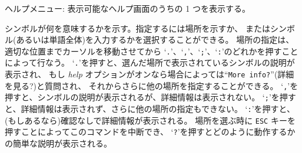 \blist{}
\item[\tb{?}]
ヘルプメニュー: 表示可能なヘルプ画面のうちの 1 つを表示する。
\item[\tb{/}]
シンボルが何を意味するかを示す。指定するには場所を示すか、
またはシンボル(あるいは単語全体)を入力するかを選択することができる。
場所の指定は、適切な位置までカーソルを移動させてから
`{\tt .}'、`{\tt ,}'、`{\tt ;}'、`{\tt :}'のどれかを押すことによって行なう。
`{\tt .}'を押すと、選んだ場所で表示されているシンボルの説明が表示され、
もし {\it help\/}
オプションがオンなら場合によっては``{\tt More info?}''(詳細を見る?)と質問され、
それからさらに他の場所を指定することができる。
`{\tt ,}'を押すと、シンボルの説明が表示されるが、詳細情報は表示されない。
`{\tt ;}'を押すと、詳細情報は表示されず、さらに他の場所の指定もできない。
`{\tt :}'を押すと、(もしあるなら)確認なしで詳細情報が表示される。
場所を選ぶ時に {\tt ESC} キーを押すことによってこのコマンドを中断でき、
`{\tt ?}'を押すとどのように動作するかの簡単な説明が表示される。

